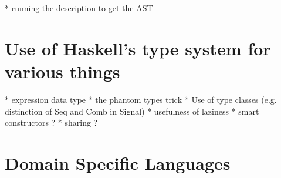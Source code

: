 \documentclass[11pt]{article}
\begin{document}
 * running the description to get the AST 

\section{Use of Haskell’s type system for various things }

 * expression data type 
 * the phantom types trick 
 * Use of type classes (e.g. distinction of Seq and Comb in Signal) 
 * usefulness of laziness 
 * smart constructors ? 
 * sharing ?



\section{Domain Specific Languages}
\end{document}
